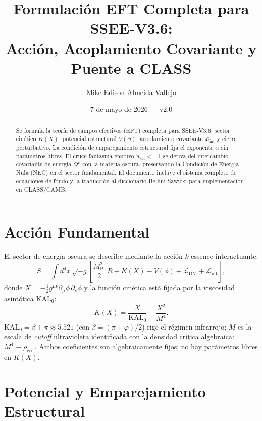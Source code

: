\documentclass[11pt,a4paper]{article}
\title{\textbf{Formulación EFT Completa para SSEE-V3.6:\\
       Acción, Acoplamiento Covariante y Puente a CLASS}}
\author{Mike Edison Almeida Vallejo}
\date{7 de mayo de 2026 --- v2.0}
\newcommand{\phiG}{\varphi}          %
\newcommand{\KAL}{\mathrm{KAL}_0}   %
\newcommand{\Mpl}{M_{\mathrm{Pl}}}
\newcommand{\half}{\tfrac{1}{2}}
\newcommand{\rhocrit}{\rho_{\mathrm{crit}}}
\newcommand{\weff}{w_{\mathrm{eff}}}
\begin{document}
\maketitle

\begin{abstract}
Se formula la teoría de campos efectivos (EFT) completa para SSEE-V3.6:
sector cinético $K(X)$, potencial estructural $V(\phi)$, acoplamiento
covariante $\mathcal{L}_{\mathrm{int}}$ y cierre perturbativo.
La condición de emparejamiento estructural fija el exponente $\alpha$ sin
parámetros libres.  El cruce fantasma efectivo $\weff < -1$ se deriva del
intercambio covariante de energía $Q^{\nu}$ con la materia oscura,
preservando la Condición de Energía Nula (NEC) en el sector fundamental.
El documento incluye el sistema completo de ecuaciones de fondo y la
traducción al diccionario Bellini-Sawicki para implementación en CLASS/CAMB.
\end{abstract}

\section{Acción Fundamental}

El sector de energía oscura se describe mediante la acción $k$-essence
interactuante:
%
\begin{equation}
  S = \int d^{4}x\,\sqrt{-g}
      \left[\frac{\Mpl^{2}}{2}\,R
            + K(X) - V(\phi)
            + \mathcal{L}_{\mathrm{DM}}
            + \mathcal{L}_{\mathrm{int}}
      \right],
  \label{eq:accion}
\end{equation}
%
donde $X = -\half g^{\mu\nu}\partial_{\mu}\phi\,\partial_{\nu}\phi$ y
la función cinética está fijada por la viscosidad asintótica $\KAL$:
%
\begin{equation}
  K(X) = \frac{X}{\KAL} + \frac{X^{2}}{M^{4}}.
  \label{eq:KX}
\end{equation}
%
$\KAL = \beta + \pi \approx 5.521$ (con $\beta = (\pi+\phiG)/2$) rige el
régimen infrarrojo; $M$ es la escala de \textit{cutoff} ultravioleta
identificada con la densidad crítica algebraica: $M^{4} \equiv \rhocrit$.
Ambos coeficientes son algebraicamente fijos; no hay parámetros libres en
$K(X)$.

\section{Potencial y Emparejamiento Estructural}
\end{document}
